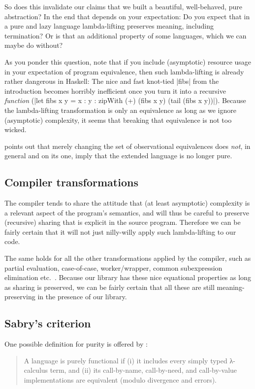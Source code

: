 \documentclass[manuscript,anonymous,screen,acmsmall]{acmart}
\begin{document}
So does this invalidate our claims that we built a beautiful, well-behaved, pure abstraction? In the end that depends on your expectation: Do you expect that in a pure and lazy language lambda-lifting preserves meaning, including termination? Or is that an additional property of some languages, which we can maybe do without?

As you ponder this question, note that if you include (asymptotic) resource usage in your expectation of program equivalence, then such lambda-lifting is already rather dangerous in Haskell: The nice and fast knot-tied |fibs| from the introduction becomes horribly inefficient once you turn it into a recursive \emph{function} (|let fibs x y = x : y  : zipWith (+) (fibs x y) (tail (fibs x y))|). Because the lambda-lifting transformation is only an equivalence as long as we ignore (asymptotic) complexity, it seems that breaking that equivalence is not too wicked.

 points out that merely changing the set of observational equivalences does \emph{not}, in general and on its one, imply that the extended language is no longer pure.

\subsection{Compiler transformations}\label{sec:comptrans}

The compiler tends to share the attitude that (at least asymptotic) complexity is a relevant aspect of the program's semantics, and will thus be careful to preserve (recursive) sharing that is explicit in the source program. Therefore we can be fairly certain that it will not just nilly-willy apply such lambda-lifting to our code.

The same holds for all the other transformations applied by the compiler, such as partial evaluation, case-of-case, worker/wrapper, common subexpression elimination etc.\ \citep{optimiser}. Because our library has these nice equational properties as long as sharing is preserved, we can be fairly certain that all these are still meaning-preserving in the presence of our library.

\subsection{Sabry's criterion}

One possible definition for purity is offered by \citet{sabry}:
\begin{quote}
A language is purely functional if (i) it includes every simply typed λ-calculus term, and
(ii) its call-by-name, call-by-need, and call-by-value implementations are equivalent (modulo
divergence and errors).
\end{quote}
\end{document}
